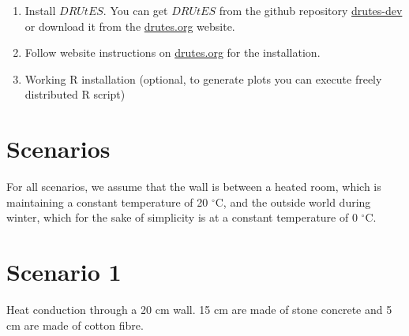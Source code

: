 \documentclass[
10pt, %
a4paper, %
oneside, %
headinclude,footinclude, %
BCOR5mm, %
]{scrartcl}
\begin{document}
\begin{enumerate}
\item Install $DRUtES$. You can get $DRUtES$ from the github repository \href{https://github.com/michalkuraz/drutes-dev/} {drutes-dev} or download it from the \href{http://drutes.org/public/?core=account}{drutes.org} website. 
\item Follow website instructions on \href{http://drutes.org/public/?core=account}{drutes.org} for the installation.
\item Working R installation (optional, to generate plots you can execute freely distributed R script) 
\end{enumerate}

\newpage
\section{Scenarios}

For all scenarios, we assume that the wall is between a heated room, which is maintaining a constant temperature of 20 $^{\circ}$C, and the outside world during winter, which for the sake of simplicity is at a constant temperature of 0 $^{\circ}$C.

\begin{table}[!h]\caption{\label{tab_heat}Material properties needed for scenarios.}
\end{table}


\section*{Scenario 1}

Heat conduction through a 20 cm wall. 15 cm are made of stone concrete and 5 cm are made of cotton fibre.
\end{document}
